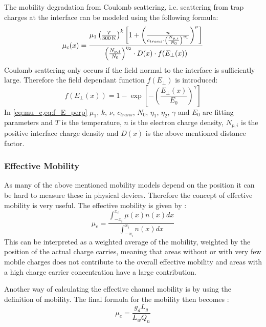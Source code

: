 The mobility degradation from Coulomb scattering, i.e. scattering from trap charges at the interface can be modeled using the following formula:
\begin{equation} \label{eq:mu_c}
    \mu_c(x) = \frac{\mu_1\left( \frac{T}{\SI{300}{\kelvin}} \right)^k \left[ 1 + \left(\frac{n}{c_{trans}%
    \cdot \left( \frac{N_{p,i}}{N_0} \right)^{\eta_1}} \right)^{\nu}\right]}{%
        \left(\frac{N_{p,i}}{N_0}\right)^{\eta_2} \cdot D(x) \cdot f(E_\perp(x)) }
\end{equation}
Coulomb scattering only occurs if the field normal to the interface is sufficiently large. Therefore the field dependant function $f(E_\perp)$ is introduced:
\begin{equation} \label{eq:f_E_perp}
    f(E_\perp(x)) = 1 - \exp\left[-\left(\frac{E_\perp(x)}{E_0}\right)^\gamma \right]
\end{equation}
In \cref{eq:mu_c,eq:f_E_perp} $\mu_1$, $k$, $\nu$, $c_{trans}$, $N_0$, $\eta_1$, $\eta_2$, $\gamma$ and $E_0$ are fitting parameters and $T$ is the temperature, $n$ is the electron charge density, $N_{p,i}$ is the positive interface charge density and $D(x)$ is the above mentioned distance factor.


\subsubsection{Effective Mobility}
As many of the above mentioned mobility models depend on the position it can be hard to measure these in physical devices. Therefore the concept of effective mobility is very useful. The effective mobility is given by \cite{Baliga2019}:
\begin{equation} \label{eq:mu_e_int}
    \mu_{e} = \frac{\int_{-x_i}^{x_i}\mu(x)n(x)dx}{\int_{-x_i}^{x_i}n(x)dx}
\end{equation}
This can be interpreted as a weighted average of the mobility, weighted by the position of the actual charge carries, meaning that areas without or with very few mobile charges does not contribute to the overall effective mobility and areas with a high charge carrier concentration have a large contribution.

Another way of calculating the effective channel mobility is by using the definition of mobility. The final formula for the mobility then becomes \cite{Gribisch2023}:
\begin{equation} \label{eq:mu_e}
    \mu_e = \frac{g_dL_g}{L_wQ_n}
\end{equation}
